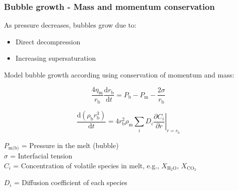 \documentclass{beamer}
\begin{document}
\begin{frame}
  \frametitle{Bubble growth - Mass and momentum conservation}

  As pressure decreases, bubbles grow due to:

  \begin{itemize}
  \item Direct decompression\\
  \item Increasing supersaturation \\
  \end{itemize}

  Model bubble growth according using conservation of momentum and mass:

  $$ \frac{4 \eta_{\text{m}}}{r_{\text{b}}} \frac{\mathrm{d} r_{\text{b}}}{\mathrm{d} t} = P_{\text{b}} - P_{\text{m}} - \frac{2 \sigma}{r_{\text{b}}} $$

  $$ \frac{\mathrm{d} (\rho_{\text{b}} r_{\text{b}}^{3})}{\mathrm{d} t} = 4 r_{\text{b}}^{2} \rho_{\text{m}} \sum_{i} D_{i} \left. \frac{\partial C_{i}}{\partial r}\right|_{r = r_{\text{b}}}$$

  $P_{\text{m(b)}}$ = Pressure in the melt (bubble) \\

  $\sigma$ = Interfacial tension \\

  $C_{i}$ = Concentration of volatile species in melt, e.g., $X_{\text{H}_{2}\text{O}}$, $X_{\text{CO}_{2}}$

  $D_{i}$ = Diffusion coefficient of each species 

\end{frame}
\end{document}

